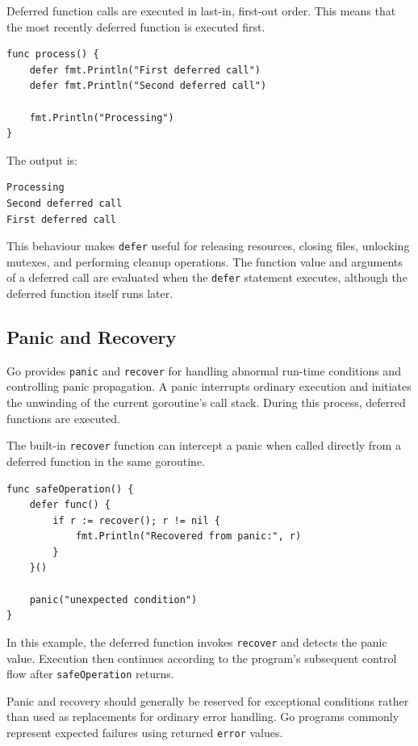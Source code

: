 Deferred function calls are executed in last-in, first-out
order. This means that the most recently deferred function
is executed first.

\begin{lstlisting}
func process() {
    defer fmt.Println("First deferred call")
    defer fmt.Println("Second deferred call")

    fmt.Println("Processing")
}
\end{lstlisting}

The output is:

\begin{lstlisting}
Processing
Second deferred call
First deferred call
\end{lstlisting}

This behaviour makes \texttt{defer} useful for releasing
resources, closing files, unlocking mutexes, and performing
cleanup operations. The function value and arguments of a
deferred call are evaluated when the \texttt{defer}
statement executes, although the deferred function itself
runs later.

\subsection{Panic and Recovery}

Go provides \texttt{panic} and \texttt{recover} for handling
abnormal run-time conditions and controlling panic
propagation. A panic interrupts ordinary execution and
initiates the unwinding of the current goroutine's call
stack. During this process, deferred functions are executed.

The built-in \texttt{recover} function can intercept a
panic when called directly from a deferred function in
the same goroutine.

\begin{lstlisting}
func safeOperation() {
    defer func() {
        if r := recover(); r != nil {
            fmt.Println("Recovered from panic:", r)
        }
    }()

    panic("unexpected condition")
}
\end{lstlisting}

In this example, the deferred function invokes
\texttt{recover} and detects the panic value. Execution
then continues according to the program's subsequent
control flow after \texttt{safeOperation} returns.

Panic and recovery should generally be reserved for
exceptional conditions rather than used as replacements
for ordinary error handling. Go programs commonly
represent expected failures using returned \texttt{error}
values.

